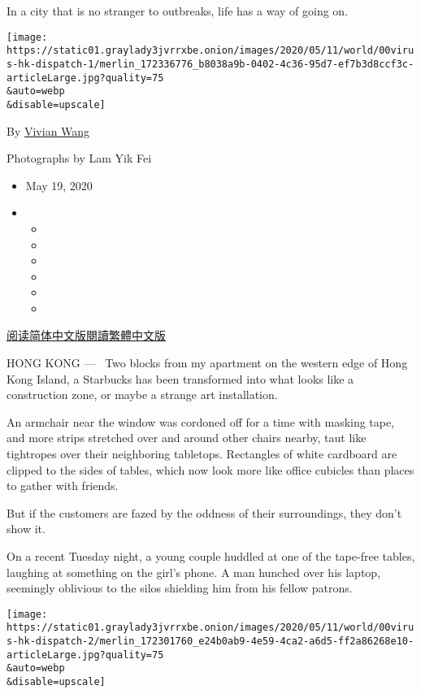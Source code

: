 In a city that is no stranger to outbreaks, life has a way of going on.

\texttt{[image: https://static01.graylady3jvrrxbe.onion/images/2020/05/11/world/00virus-hk-dispatch-1/merlin\_172336776\_b8038a9b-0402-4c36-95d7-ef7b3d8ccf3c-articleLarge.jpg?quality=75\\\&auto=webp\\\&disable=upscale]}

By \href{https://www.nytimes3xbfgragh.onion/by/vivian-wang}{Vivian Wang}

Photographs by Lam Yik Fei

\begin{itemize}
\item
  May 19, 2020
\item
  \begin{itemize}
  \item
  \item
  \item
  \item
  \item
  \item
  \end{itemize}
\end{itemize}

\href{https://cn.nytimes3xbfgragh.onion/china/20200520/coronavirus-hong-kong/}{阅读简体中文版}\href{https://cn.nytimes3xbfgragh.onion/china/20200520/coronavirus-hong-kong/zh-hant/}{閱讀繁體中文版}

HONG KONG --- ~Two blocks from my apartment on the western edge of Hong
Kong Island, a Starbucks has been transformed into what looks like a
construction zone, or maybe a strange art installation.

An armchair near the window was cordoned off for a time with masking
tape, and more strips stretched over and around other chairs nearby,
taut like tightropes over their neighboring tabletops. Rectangles of
white cardboard are clipped to the sides of tables, which now look more
like office cubicles than places to gather with friends.

But if the customers are fazed by the oddness of their surroundings,
they don't show it.

On a recent Tuesday night, a young couple huddled at one of the
tape-free tables, laughing at something on the girl's phone. A man
hunched over his laptop, seemingly oblivious to the silos shielding him
from his fellow patrons.

\texttt{[image: https://static01.graylady3jvrrxbe.onion/images/2020/05/11/world/00virus-hk-dispatch-2/merlin\_172301760\_e24b0ab9-4e59-4ca2-a6d5-ff2a86268e10-articleLarge.jpg?quality=75\\\&auto=webp\\\&disable=upscale]}


